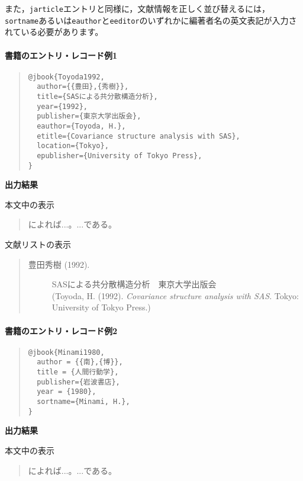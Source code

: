 \documentclass[12pt]{ltjsarticle}
\begin{document}
また，\texttt{jarticle}エントリと同様に，文献情報を正しく並び替えるには，\texttt{sortname}あるいは\texttt{eauthor}と\texttt{eeditor}のいずれかに編著者名の英文表記が入力されている必要があります。


\paragraph{書籍のエントリ・レコード例1}

\begin{quote}
\begin{verbatim}
@jbook{Toyoda1992,
  author={{豊田},{秀樹}},
  title={SASによる共分散構造分析},
  year={1992},
  publisher={東京大学出版会},
  eauthor={Toyoda, H.},
  etitle={Covariance structure analysis with SAS},
  location={Tokyo},
  epublisher={University of Tokyo Press},
}
\end{verbatim}
\end{quote}


\textbf{出力結果}

本文中の表示
\begin{quote}
\textcite{Toyoda1992}によれば...。...である\parencite{Toyoda1992}。
\end{quote}


文献リストの表示
\begin{quote}
\begin{description}
  \item[\textrm{豊田秀樹 (1992).}]SASによる共分散構造分析　東京大学出版会\\
(Toyoda, H. (1992). \textit{Covariance structure analysis with SAS}. Tokyo: University of Tokyo Press.)
\end{description}
\end{quote}


\paragraph{書籍のエントリ・レコード例2}
\begin{quote}
\begin{verbatim}
@jbook{Minami1980,
  author = {{南},{博}},
  title = {人間行動学},
  publisher={岩波書店},
  year = {1980},
  sortname={Minami, H.},
}
\end{verbatim}
\end{quote}


\textbf{出力結果}

本文中の表示
\begin{quote}
\textcite{Minami1980}によれば...。...である\parencite{Minami1980}。
\end{quote}
\end{document}
